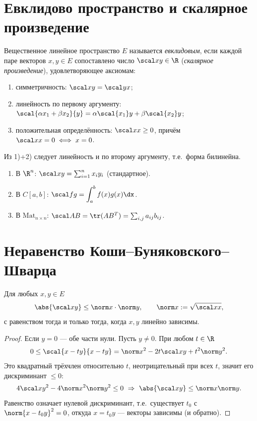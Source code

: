 \section{Евклидово пространство и скалярное произведение}

\begin{definition}
Вещественное линейное пространство $E$ называется \emph{евклидовым}, если каждой паре векторов
$x,y\in E$ сопоставлено число $\scal xy\in\R$ (\emph{скалярное произведение}), удовлетворяющее
аксиомам:
\begin{enumerate}[label=\arabic*),leftmargin=*,nosep]
  \item симметричность: $\scal xy=\scal yx$;
  \item линейность по первому аргументу: $\scal{\alpha x_1+\beta x_2}{y}=\alpha\scal{x_1}y+\beta\scal{x_2}y$;
  \item положительная определённость: $\scal xx\ge0$, причём $\scal xx=0\iff x=0$.
\end{enumerate}
\end{definition}

\begin{remark}
Из 1)+2) следует линейность и по второму аргументу, т.е.\ форма билинейна.
\end{remark}

\begin{example}\leavevmode
\begin{enumerate}[label=\arabic*),leftmargin=*,nosep]
  \item В $\R^n$: $\scal xy=\sum_{i=1}^n x_iy_i$ (стандартное).
  \item В $C[a,b]$: $\displaystyle\scal fg=\int_a^b f(x)g(x)\dx$.
  \item В $\mathrm{Mat}_{n\times n}$: $\scal AB=\tr(AB^{T})=\sum_{i,j}a_{ij}b_{ij}$.
\end{enumerate}
\end{example}

\section{Неравенство Коши–Буняковского–Шварца}

\begin{theorem}
Для любых $x,y\in E$
\[
  \abs{\scal xy}\le\norm x\cdot\norm y,\qquad \norm x:=\sqrt{\scal xx},
\]
с равенством тогда и только тогда, когда $x,y$ линейно зависимы.
\end{theorem}

\begin{proof}
Если $y=0$ — обе части нули. Пусть $y\ne0$. При любом $t\in\R$
\[
  0\le\scal{x-ty}{x-ty}=\norm x^2-2t\scal xy+t^2\norm y^2 .
\]
Это квадратный трёхчлен относительно $t$, неотрицательный при всех $t$, значит его дискриминант
$\le0$:
\[
  4\scal xy^2-4\norm x^2\norm y^2\le0\ \Rightarrow\ \abs{\scal xy}\le\norm x\norm y .
\]
Равенство означает нулевой дискриминант, т.е.\ существует $t_0$ с $\norm{x-t_0y}^2=0$, откуда
$x=t_0y$ — векторы зависимы (и обратно).
\end{proof}

